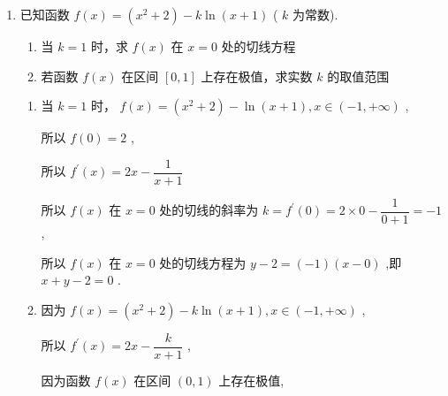 \begin{enumerate}
\begin{enumerate}
\begin{jieda}
            若函数 $f\left( x\right)$ 既有极大值也有极小值,则 ${x}^{2} - {ax} + 3 = 0$ 有 2 个不相等的正根 $x_1,x_2$，则 $\left\{  \begin{matrix} \Delta  = {a}^{2} - {12} > 0 \\  {x}_{1} + {x}_{2} = a > 0 \\  {x}_{1}{x}_{2} = 3 > 0 \end{matrix}\right.$ ,解得 $a > 2\sqrt{3}$
        \end{jieda}
        
        \item 已知函数 $f\left( x\right)  = \left( {{x}^{2} + 2}\right)  - k\ln \left( {x + 1}\right)$ ( $k$ 为常数).
        \begin{enumerate}
            \item 当 $k = 1$ 时，求 $f\left( x\right)$ 在 $x = 0$ 处的切线方程
            \item 若函数 $f\left( x\right)$ 在区间 $\left\lbrack  {0,1}\right\rbrack$ 上存在极值，求实数 $k$ 的取值范围
        \end{enumerate}
        
        \begin{jieda}
            \begin{enumerate}
                \item 当 $k = 1$ 时， $f\left( x\right)  = \left( {{x}^{2} + 2}\right)  - \ln \left( {x + 1}\right) ,x \in  \left( {-1, + \infty }\right)$ ,
                
                所以 $f\left( 0\right)  = 2$ ,
                
                所以 ${f}^{\prime }\left( x\right)  = {2x} - \dfrac{1}{x + 1}$
                
                所以 $f\left( x\right)$ 在 $x = 0$ 处的切线的斜率为 $k = {f}^{\prime }\left( 0\right)  = 2 \times  0 - \dfrac{1}{0 + 1} =  - 1$ ,
                
                所以 $f\left( x\right)$ 在 $x = 0$ 处的切线方程为 $y - 2 = \left( {-1}\right) \left( {x - 0}\right)$ ,即 $x + y - 2 = 0$ .

                \item 因为 $f\left( x\right)  = \left( {{x}^{2} + 2}\right)  - k\ln \left( {x + 1}\right) ,x \in  \left( {-1, + \infty }\right)$ ,
                
                所以 ${f}^{\prime }\left( x\right)  = {2x} - \dfrac{k}{x + 1}$ ,
                
                因为函数 $f\left( x\right)$ 在区间 $\left( {0,1}\right)$ 上存在极值,
                

\end{enumerate}
\end{jieda}
\end{enumerate}
\end{enumerate}
